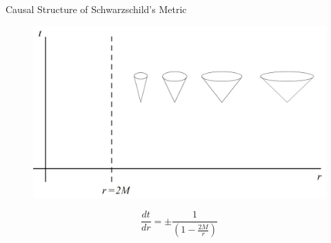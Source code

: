 \documentclass{beamer}
\begin{document}
        \begin{frame}{Causal Structure of Schwarzschild's Metric}
        	\begin{center}
				\begin{figure}
				\includegraphics[scale=0.75]	{fig1.jpg}
				\end{figure}
                \tiny{
                $$ \frac{dt}{dr}=\pm\frac{1}{\left(1-\frac{2M}{r}\right)} $$}
			\end{center}
        \end{frame}
\end{document}
